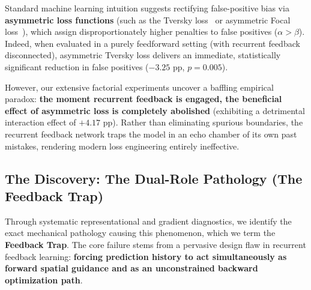 Standard machine learning intuition suggests rectifying false-positive bias
via \textbf{asymmetric loss functions} (such as the Tversky
loss~\cite{salehi2017tversky} or asymmetric Focal loss~\cite{yeung2022unified}),
which assign disproportionately higher penalties to false positives ($\alpha > \beta$).
Indeed, when evaluated in a purely feedforward setting (with recurrent feedback
disconnected), asymmetric Tversky loss delivers an immediate, statistically
significant reduction in false positives ($-3.25\text{ pp}$, $p = 0.005$).

However, our extensive factorial experiments uncover a baffling empirical
paradox: \textbf{the moment recurrent feedback is engaged, the beneficial
effect of asymmetric loss is completely abolished} (exhibiting a detrimental
interaction effect of $+4.17\text{ pp}$). Rather than eliminating spurious
boundaries, the recurrent feedback network traps the model in an echo chamber
of its own past mistakes, rendering modern loss engineering entirely
ineffective.

\subsection{The Discovery: The Dual-Role Pathology (The Feedback Trap)}
Through systematic representational and gradient diagnostics, we identify
the exact mechanical pathology causing this phenomenon, which we term the
\textbf{Feedback Trap}. The core failure stems from a pervasive design flaw
in recurrent feedback learning: \textbf{forcing prediction history to act
simultaneously as forward spatial guidance and as an unconstrained backward
optimization path}.

